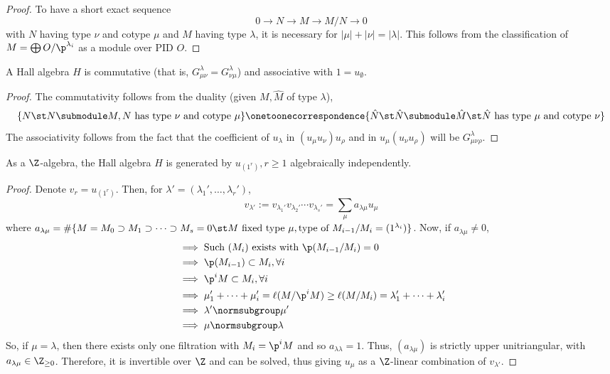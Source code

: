 \documentclass[11pt,leqno,oneside]{amsbook}
\numberwithin{thm}{section}
\newcommand{\subtableau}{\normsubgroup}
\begin{document}
\begin{proof}
  To have a short exact sequence \[
    0 \to N \to M \to M/N \to 0
  \]
  with \(N\) having type \(\nu\) and cotype \(\mu\) and \(M\) having
  type \(\lambda\), it is necessary for \(|\mu| + |\nu| =
  |\lambda|\). This follows from the classification of \(M = \bigoplus
  O/\p^{\lambda_i}\) as a module over PID \(O\).
\end{proof}
\begin{prop}
  A Hall algebra \(H\) is commutative (that is, \(G^\lambda_{\mu \nu}
  = G^\lambda_{\nu \mu}\)) and associative with \(1 =
  u_\emptyset\). 
\end{prop}
\begin{proof}
  The commutativity follows from the duality (given \(M,\hat{M}\) of
  type \(\lambda\)),  \[
    \{N \st N \submodule M, N \text{ has type }\nu \text{ and cotype
    }\mu \} \onetoonecorrespondence \{\hat{N}  \st \hat{N} \submodule \hat{M} \st \hat{N}
    \text{ has type }\mu \text{ and cotype }\nu\}
  \]
  The associativity follows from the fact that the coefficient of
  \(u_\lambda\) in \((u_\mu u_\nu) u_\rho\) and in \(u_\mu(u_\nu
  u_\rho)\) will be \(G^\lambda_{\mu \nu \rho}\).
\end{proof}
\begin{prop}
  As a \(\Z\)-algebra, the Hall algebra \(H\) is generated by
  \(u_{(1^r)}, r \geq 1\) algebraically independently.
\end{prop}
\begin{proof}
  Denote \(v_r = u_{(1^r)}\). Then, for \(\lambda' = (\lambda_1',
  \ldots, \lambda_r')\), \[
    v_{\lambda'} := v_{\lambda_1'} v_{\lambda_2'} \cdots v_{\lambda_s'}
    = \sum_\mu a_{\lambda \mu} u_\mu
  \]
  where \(a_{\lambda \mu} = \#\{M=M_0 \supset M_1 \supset \cdots
  \supset M_s = 0 \st M \text{ fixed type }\mu, \text{type of
  }M_{i-1}/M_i = (1^{\lambda_i})\}\). Now, if \(a_{\lambda \mu} \neq
  0\),
  \begin{align*}
    & \implies \text{Such } (M_i) \text{ exists with }\p(M_{i-1}/M_i)
      = 0 \\
    & \implies \p(M_{i-1}) \subset M_i, \forall i \\
    & \implies \p^i M \subset M_i,
      \forall i \\
    & \implies \mu_1' + \cdots + \mu_i' = \ell(M/\p^iM) \geq
      \ell(M/M_i) = \lambda_1' + \cdots + \lambda_i' \\
    & \implies \lambda' \subtableau \mu' \\
    & \implies \mu \subtableau \lambda
  \end{align*}
  So, if \(\mu = \lambda\), then there exists only one filtration with
  \(M_i = \p^i M\) and so \(a_{\lambda \lambda} = 1\). Thus,
  \((a_{\lambda \mu})\) is strictly upper unitriangular, with \(a_{\lambda
    \mu} \in \Z_{\geq 0}\). Therefore, it is invertible over \(\Z\)
  and can be solved, thus giving \(u_\mu\) as a \(\Z\)-linear
  combination of \(v_{\lambda'}\). 
\end{proof}
\end{document}
